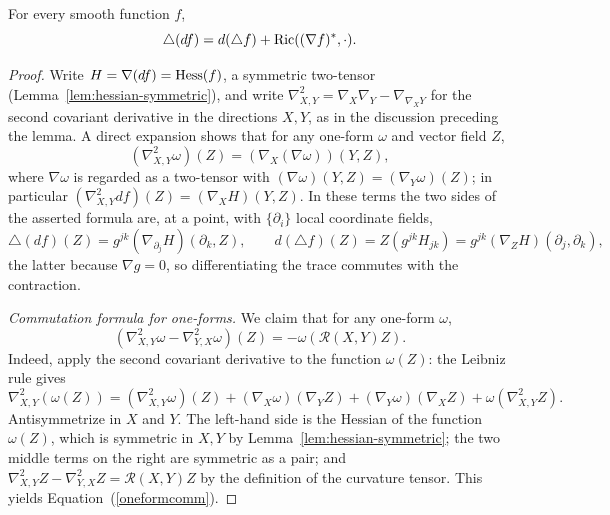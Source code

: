 \begin{lemma}
\label{lem:laplacian-one-form}

\label{lapformula}



For every smooth function $f$,
\[
  \triangle(df)=d(\triangle f)+\operatorname{Ric}((\nabla f)^*,\mathord\cdot).
\]
\end{lemma}

\begin{proof}
\sketch
{}

Write $H=\nabla(df)=\operatorname{Hess}(f)$, a symmetric two-tensor
(Lemma~\ref{lem:hessian-symmetric}), and write
$\nabla^2_{X,Y}=\nabla_X\nabla_Y-\nabla_{\nabla_XY}$ for the second
covariant derivative in the directions $X,Y$, as in the discussion
preceding the lemma. A direct expansion shows that for any one-form
$\omega$ and vector field $Z$,
$$\left(\nabla^2_{X,Y}\omega\right)(Z)=(\nabla_X(\nabla\omega))(Y,Z),$$
where $\nabla\omega$ is regarded as a two-tensor with
$(\nabla\omega)(Y,Z)=(\nabla_Y\omega)(Z)$; in particular
$\left(\nabla^2_{X,Y}df\right)(Z)=(\nabla_XH)(Y,Z)$. In these terms
the two sides of the asserted formula are, at a point, with
$\{\partial_i\}$ local coordinate fields,
$$\triangle(df)(Z)=g^{jk}\left(\nabla_{\partial_j}H\right)(\partial_k,Z),
\qquad
d(\triangle f)(Z)=Z\left(g^{jk}H_{jk}\right)
=g^{jk}\left(\nabla_ZH\right)(\partial_j,\partial_k),$$
the latter because $\nabla g=0$, so differentiating the trace
commutes with the contraction.

\emph{Commutation formula for one-forms.} We claim that for any
one-form $\omega$,
\begin{equation}\label{oneformcomm}
\left(\nabla^2_{X,Y}\omega-\nabla^2_{Y,X}\omega\right)(Z)
=-\omega\left({\mathcal R}(X,Y)Z\right).
\end{equation}
Indeed, apply the second covariant derivative to the function
$\omega(Z)$: the Leibniz rule gives
$$\nabla^2_{X,Y}\left(\omega(Z)\right)
=\left(\nabla^2_{X,Y}\omega\right)(Z)
+(\nabla_X\omega)(\nabla_YZ)+(\nabla_Y\omega)(\nabla_XZ)
+\omega\left(\nabla^2_{X,Y}Z\right).$$
Antisymmetrize in $X$ and $Y$. The left-hand side is the Hessian of
the function $\omega(Z)$, which is symmetric in $X,Y$ by
Lemma~\ref{lem:hessian-symmetric}; the two middle terms on the right
are symmetric as a pair; and
$\nabla^2_{X,Y}Z-\nabla^2_{Y,X}Z={\mathcal R}(X,Y)Z$ by the
definition of the curvature tensor. This yields
Equation~(\ref{oneformcomm}).


\end{proof}
